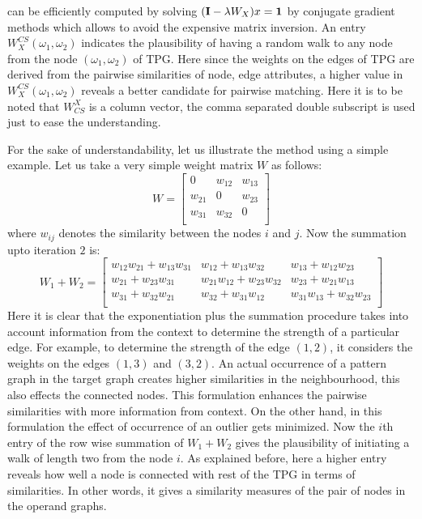  can be efficiently computed by solving $(\mathbf{I}-\lambda W_X)x=\mathbf{1}$ by conjugate gradient methods which allows to avoid the expensive matrix inversion. An entry $W^{CS}_X(\omega_1,\omega_2)$ indicates the plausibility of having a random walk to any node from the node $(\omega_1,\omega_2)$ of TPG. Here since the weights on the edges of TPG are derived from the pairwise similarities of node, edge attributes, a higher value in $W^{CS}_X(\omega_1,\omega_2)$ reveals a better candidate for pairwise matching. Here it is to be noted that $W_{CS}^X$ is a column vector, the comma separated double subscript is used just to ease the understanding.

For the sake of understandability, let us illustrate the method using a simple example. Let us take a very simple weight matrix $W$ as follows:
\[W = 
\begin{bmatrix}
0		&w_{12}	&w_{13}\\
w_{21}	&0		&w_{23}\\
w_{31}	&w_{32}	&0\\
\end{bmatrix}
\]
where $w_{ij}$ denotes the similarity between the nodes $i$ and $j$.
Now the summation upto iteration $2$ is:
\[W_1+W_2=
\begin{bmatrix}
w_{12}w_{21}+w_{13}w_{31}	&w_{12}+w_{13}w_{32}			&w_{13}+w_{12}w_{23}\\
w_{21}+w_{23}w_{31}		 	&w_{21}w_{12}+w_{23}w_{32}	&w_{23}+w_{21}w_{13}\\
w_{31}+w_{32}w_{21}			&w_{32}+w_{31}w_{12}			&w_{31}w_{13}+w_{32}w_{23}\\
\end{bmatrix}
\]
Here it is clear that the exponentiation plus the summation procedure takes into account information from the context to determine the strength of a particular edge. For example, to determine the strength of the edge $(1,2)$, it considers the weights on the edges $(1,3)$ and $(3,2)$. An actual occurrence of a pattern graph in the target graph creates higher similarities in the neighbourhood, this also effects the connected nodes. This formulation enhances the pairwise similarities with more information from context. On the other hand, in this formulation the effect of occurrence of an outlier gets minimized. Now the $i$th entry of the row wise summation of $W_1+W_2$ gives the plausibility of initiating a walk of length two from the node $i$. As explained before, here a higher entry reveals how well a node is connected with rest of the TPG in terms of similarities. In other words, it gives a similarity measures of the pair of nodes in the operand graphs.

